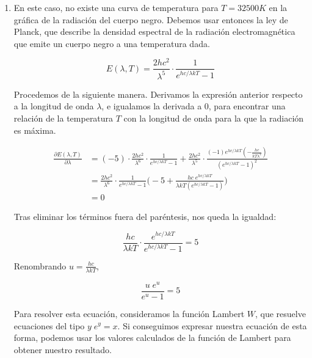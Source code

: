 \begin{enumerate}
    \vspace{20px}
    \item En este caso, no existe una curva de temperatura para $T = 32 500 K$ en la gráfica de la radiación del cuerpo negro.
    Debemos usar entonces la ley de Planck, que describe
    la densidad espectral de la radiación electromagnética que emite un cuerpo negro a una temperatura dada.

    \begin{equation*}
        E(\lambda, T) = \frac{2hc^2}{\lambda^5} \cdot \frac{1}{e^{hc/\lambda k T} - 1}
    \end{equation*}

    Procedemos de la siguiente manera. Derivamos la expresión anterior respecto a la longitud de onda $\lambda$, e igualamos
    la derivada a 0, para encontrar una relación de la temperatura $T$ con la longitud de onda para la que la radiación es
    máxima.

    \begin{align*}
        \frac{\partial E(\lambda, T)}{\partial \lambda}  &= (-5) \cdot \frac{2hc^2}{\lambda^6} \cdot \frac{1}{e^{hc/\lambda k T} - 1}
        + \frac{2hc^2}{\lambda^5} \cdot
        \frac{(-1) e^{hc/\lambda k T} (- \frac{hc}{k T \lambda^2})}{(e^{hc/\lambda k T} - 1)^2} \\
         &= \frac{2hc^2}{\lambda^6} \cdot \frac{1}{e^{hc/\lambda k T} - 1}
        \biggl( -5 + \frac{hc\;e^{hc/\lambda k T}}{\lambda k T  (e^{hc/\lambda k T} - 1)} \biggr) \\
        &= 0
    \end{align*}

    Tras eliminar los términos fuera del paréntesis, nos queda la igualdad:

    \begin{equation*}
        \frac{hc}{\lambda k T} \cdot \frac{e^{hc/\lambda k T}}{e^{hc/\lambda k T} - 1} = 5
    \end{equation*}

    Renombrando $u = \frac{hc}{\lambda k T}$,

    \begin{equation*}
        \frac{u\; e^u}{e^u -1} = 5
    \end{equation*}

    Para resolver esta ecuación, consideramos la función Lambert $W$, que resuelve ecuaciones del tipo ${y\;e^{y}=x}$.
    Si conseguimos expresar nuestra ecuación de esta forma, podemos usar los valores calculados de la función de Lambert
    para obtener nuestro resultado.


\end{enumerate}
